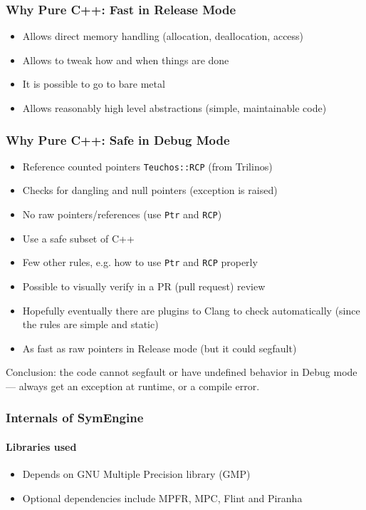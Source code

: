 \documentclass{beamer}
\begin{document}
\begin{frame}
\frametitle{Why Pure C++: Fast in Release Mode}
\begin{itemize}
    \item Allows direct memory handling (allocation, deallocation, access)
    \item Allows to tweak how and when things are done
    \item It is possible to go to bare metal
    \item Allows reasonably high level abstractions (simple, maintainable
        code)
\end{itemize}
\end{frame}

\begin{frame}
\frametitle{Why Pure C++: Safe in Debug Mode}
\begin{itemize}
    \item Reference counted pointers \texttt{Teuchos::RCP} (from Trilinos)
    \item Checks for dangling and null pointers (exception is raised)
    \item No raw pointers/references (use \texttt{Ptr} and \texttt{RCP})
    \item Use a safe subset of C++
    \item Few other rules, e.g. how to use \texttt{Ptr} and \texttt{RCP}
          properly
    \item Possible to visually verify in a PR (pull request) review
    \item Hopefully eventually there are plugins to Clang to check
        automatically (since the rules are simple and static)
    \item As fast as raw pointers in Release mode (but it could segfault)
\end{itemize}
    Conclusion: the code cannot segfault or have undefined behavior in Debug
    mode --- always get an exception at runtime, or a compile error.
\end{frame}


\begin{frame}
\frametitle{Internals of SymEngine}
\framesubtitle{Libraries used}
\begin{itemize}
\item Depends on GNU Multiple Precision library (GMP)
\item Optional dependencies include MPFR, MPC, Flint and Piranha
\end{itemize}
\end{frame}
\end{document}

